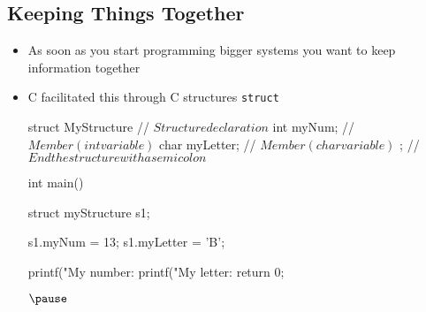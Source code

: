 
\begin{slide}
\section[-2]{Keeping Things Together}

\begin{PauseHighLight}
  \begin{itemize}
  \item As soon as you start programming bigger systems you want to
    keep information together\pause
  \item C facilitated this through C structures \texttt{struct}
    \begin{cpp}
      struct MyStructure {   // $Structure declaration$
        int myNum;           // $Member (int variable)$
        char myLetter;       // $Member (char variable)$
      }; // $End the structure with a semicolon$

      int main() {
        struct myStructure s1;

        s1.myNum = 13;
        s1.myLetter = 'B';

        printf("My number: %
        printf("My letter: %
        return 0;
      } $\pause$
    \end{cpp}
  \end{itemize}
\end{PauseHighLight}

\end{slide}


